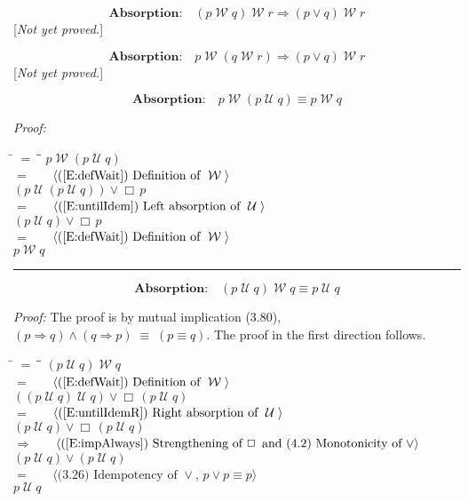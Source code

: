 \documentclass[fleqn, leqno]{article}
\newcommand{\lgap}{2pt}                             %
\newcommand{\mymathindent}{24pt}                    %
\newcommand{\equivs}{\ensuremath{\;\equiv\;}}       %
\newcommand{\impl}{\ensuremath{\Rightarrow}}        %
\newcommand{\Until}{\;\mathcal{U}\;}
\newcommand{\Wait}{\;\mathcal{W}\;}
\newcommand{\Always}{\Box\,}
\newcommand{\myqed}{\rule[-.23ex]{1.2ex}{2.0ex}}
\newcommand{\myqedtab}{\hspace{388.5pt}}              %
\newcommand{\Gll} {\langle}                         %
\newcommand{\Ggg} {\rangle}                         %
\newcommand{\Hint}[1]     {\ \ \ $\Gll              \mbox{#1} \Ggg$ }   %
\begin{document}
\begin{equation}\label{E:waitImpAbsR}
\textbf{Absorption:}\quad (p \Wait q) \Wait r \impl (p \lor q) \Wait r
\end{equation}
[\textit{Not yet proved.}]

\begin{equation}\label{E:waitImpAbsL}
\textbf{Absorption:}\quad p \Wait (q \Wait r) \impl (p \lor q) \Wait r
\end{equation}
[\textit{Not yet proved.}]

\begin{equation}\label{E:leftWaitAbsUtil}
\textbf{Absorption:}\quad p \Wait (p \Until q) \equiv p \Wait q
\end{equation}

\emph{Proof:}
\begin{tabbing}
\hspace{\mymathindent} \= $= \;$ \= \myqedtab \= \kill
\> \> $p \Wait (p \Until q)$\\[\lgap]
\> $=$ \> \Hint{(\ref{E:defWait}) Definition of $\Wait$} \\[\lgap]
\> \> $(p \Until (p \Until q)) \lor \Always p$\\[\lgap]
\> $=$ \> \Hint{(\ref{E:untilIdem}) Left absorption of $\Until$} \\[\lgap]
\> \> $(p \Until q) \lor \Always p$\\[\lgap]
\> $=$ \> \Hint{(\ref{E:defWait}) Definition of $\Wait$} \\[\lgap]
\> \> $p \Wait q$ \> \myqed
\end{tabbing}

\begin{equation}\label{E:rightWaitAbsUtil}
\textbf{Absorption:}\quad (p \Until q) \Wait q \equiv p \Until q
\end{equation}

\emph{Proof:} The proof is by mutual implication (3.80), $(p\impl q) \land (q\impl p) \equivs (p\equiv q)$.
The proof in the first direction follows.
\begin{tabbing}
\hspace{\mymathindent} \= $= \;$ \= \myqedtab \= \kill
\> \> $(p \Until q) \Wait q$\\[\lgap]
\> $=$ \> \Hint{(\ref{E:defWait}) Definition of $\Wait$} \\[\lgap]
\> \> $((p \Until q) \Until q) \lor \Always (p \Until q)$\\[\lgap]
\> $=$ \> \Hint{(\ref{E:untilIdemR}) Right absorption of $\Until$} \\[\lgap]
\> \> $(p \Until q) \lor \Always (p \Until q)$\\[\lgap]
\> $\impl$ \> \Hint{(\ref{E:impAlways}) Strengthening of $\Always$ and (4.2) Monotonicity of $\lor$} \\[\lgap]
\> \> $(p \Until q) \lor (p \Until q)$\\[\lgap]
\> $=$ \> \Hint{(3.26) Idempotency of $\lor$, $p \lor p \equiv p$} \\[\lgap]
\> \> $p \Until q$
\end{tabbing}
\end{document}
